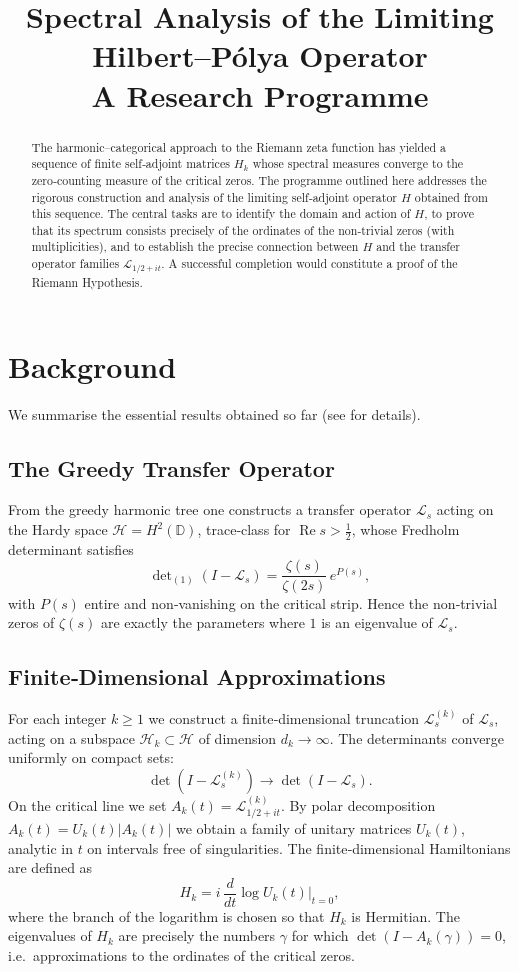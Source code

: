 \documentclass[11pt,a4paper]{article}
\title{\bfseries Spectral Analysis of the Limiting Hilbert–Pólya Operator\\
\large A Research Programme}
\author{}
\date{}
\theoremstyle{remark}
\newcommand{\cL}{\mathcal{L}}
\newcommand{\cH}{\mathcal{H}}
\begin{document}
\maketitle

\begin{abstract}
The harmonic–categorical approach to the Riemann zeta function has yielded a sequence of finite self‑adjoint matrices $H_k$ whose spectral measures converge to the zero‑counting measure of the critical zeros. The programme outlined here addresses the rigorous construction and analysis of the limiting self‑adjoint operator $H$ obtained from this sequence. The central tasks are to identify the domain and action of $H$, to prove that its spectrum consists precisely of the ordinates of the non‑trivial zeros (with multiplicities), and to establish the precise connection between $H$ and the transfer operator families $\cL_{1/2+it}$. A successful completion would constitute a proof of the Riemann Hypothesis.
\end{abstract}

\section{Background}
We summarise the essential results obtained so far (see \cite{findings} for details).

\subsection{The Greedy Transfer Operator}
From the greedy harmonic tree one constructs a transfer operator $\cL_s$ acting on the Hardy space $\cH = H^2(\mathbb{D})$, trace‑class for $\operatorname{Re}s>\tfrac12$, whose Fredholm determinant satisfies
\begin{equation}\label{eq:det}
\det\nolimits_{(1)}(I-\cL_s)=\frac{\zeta(s)}{\zeta(2s)}\,e^{P(s)},
\end{equation}
with $P(s)$ entire and non‑vanishing on the critical strip. Hence the non‑trivial zeros of $\zeta(s)$ are exactly the parameters where $1$ is an eigenvalue of $\cL_s$.

\subsection{Finite‑Dimensional Approximations}
For each integer $k\ge1$ we construct a finite‑dimensional truncation $\cL_s^{(k)}$ of $\cL_s$, acting on a subspace $\cH_k\subset\cH$ of dimension $d_k\to\infty$. The determinants converge uniformly on compact sets:
\[
\det(I-\cL_s^{(k)})\longrightarrow\det(I-\cL_s).
\]
On the critical line we set $A_k(t)=\cL_{1/2+it}^{(k)}$. By polar decomposition $A_k(t)=U_k(t)|A_k(t)|$ we obtain a family of unitary matrices $U_k(t)$, analytic in $t$ on intervals free of singularities. The finite‑dimensional Hamiltonians are defined as
\[
H_k = i\,\frac{d}{dt}\log U_k(t)\Big|_{t=0},
\]
where the branch of the logarithm is chosen so that $H_k$ is Hermitian. The eigenvalues of $H_k$ are precisely the numbers $\gamma$ for which $\det(I-A_k(\gamma))=0$, i.e.\ approximations to the ordinates of the critical zeros.
\end{document}
